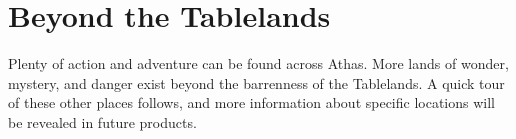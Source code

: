 \section{Beyond the Tablelands}
Plenty of action and adventure can be found across Athas. More lands of wonder, mystery, and danger exist beyond the barrenness of the Tablelands. A quick tour of these other places follows, and more information about specific locations will be revealed in future products.




